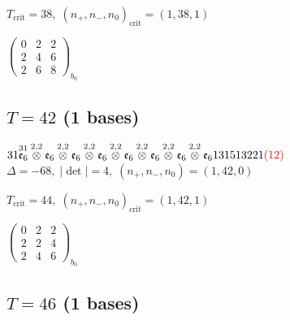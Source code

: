 \documentclass[10pt]{article}
\begin{document}
\hspace{1em}$T_{\text{crit}}=38,\; (n_+,n_-,n_0)_{\text{crit}}=(1,38,1)$

\hspace{2em}$\left(\begin{smallmatrix}0 & 2 & 2 \\ 2 & 4 & 6 \\ 2 & 6 & 8\end{smallmatrix}\right)_{\!b_0}$


\subsection*{$T = 42$ \quad (1 bases)}
\smallskip

$31\overset{31}{\mathfrak{e}_6}\overset{2,2}{\otimes}\mathfrak{e}_6\overset{2,2}{\otimes}\mathfrak{e}_6\overset{2,2}{\otimes}\mathfrak{e}_6\overset{2,2}{\otimes}\mathfrak{e}_6\overset{2,2}{\otimes}\mathfrak{e}_6\overset{2,2}{\otimes}\mathfrak{e}_6\overset{2,2}{\otimes}\mathfrak{e}_6131513221\textcolor{red}{(12)}$ \quad $\Delta=-68,\; |\det|=4,\; (n_+,n_-,n_0)=(1,42,0)$

\hspace{1em}$T_{\text{crit}}=44,\; (n_+,n_-,n_0)_{\text{crit}}=(1,42,1)$

\hspace{2em}$\left(\begin{smallmatrix}0 & 2 & 2 \\ 2 & 2 & 4 \\ 2 & 4 & 6\end{smallmatrix}\right)_{\!b_0}$


\subsection*{$T = 46$ \quad (1 bases)}
\smallskip
\end{document}
